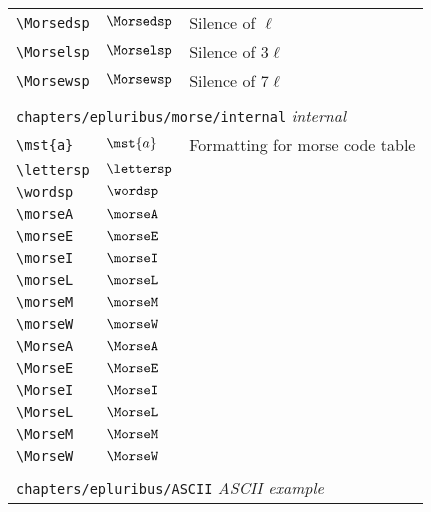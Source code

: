\begin{longtable}{lll}
 {\color[rgb]{0.5,0.5,0.5}\texttt{\textbackslash Morsedsp}} & $\Morsedsp$ &  Silence of $\ell$\\ 
 {\color[rgb]{0.5,0.5,0.5}\texttt{\textbackslash Morselsp}} & $\Morselsp$ &  Silence of $3\ell$\\ 
 {\color[rgb]{0.5,0.5,0.5}\texttt{\textbackslash Morsewsp}} & $\Morsewsp$ &  Silence of $7\ell$\\ 
  &  & \\ 
 \multicolumn{3}{l}{{\color[rgb]{0.5,0.5,0.5}\texttt{chapters/epluribus/morse/internal}} \emph{internal}}\\ 
 \hline
{\color[rgb]{0.5,0.5,0.5}\texttt{\textbackslash mst\{a\}}} & $\mst{a}$ &  Formatting for morse code table\\ 
 {\color[rgb]{0.5,0.5,0.5}\texttt{\textbackslash lettersp}} & $\lettersp$ & \\ 
 {\color[rgb]{0.5,0.5,0.5}\texttt{\textbackslash wordsp}} & $\wordsp$ & \\ 
 {\color[rgb]{0.5,0.5,0.5}\texttt{\textbackslash morseA}} & $\morseA$ & \\ 
 {\color[rgb]{0.5,0.5,0.5}\texttt{\textbackslash morseE}} & $\morseE$ & \\ 
 {\color[rgb]{0.5,0.5,0.5}\texttt{\textbackslash morseI}} & $\morseI$ & \\ 
 {\color[rgb]{0.5,0.5,0.5}\texttt{\textbackslash morseL}} & $\morseL$ & \\ 
 {\color[rgb]{0.5,0.5,0.5}\texttt{\textbackslash morseM}} & $\morseM$ & \\ 
 {\color[rgb]{0.5,0.5,0.5}\texttt{\textbackslash morseW}} & $\morseW$ & \\ 
 {\color[rgb]{0.5,0.5,0.5}\texttt{\textbackslash MorseA}} & $\MorseA$ & \\ 
 {\color[rgb]{0.5,0.5,0.5}\texttt{\textbackslash MorseE}} & $\MorseE$ & \\ 
 {\color[rgb]{0.5,0.5,0.5}\texttt{\textbackslash MorseI}} & $\MorseI$ & \\ 
 {\color[rgb]{0.5,0.5,0.5}\texttt{\textbackslash MorseL}} & $\MorseL$ & \\ 
 {\color[rgb]{0.5,0.5,0.5}\texttt{\textbackslash MorseM}} & $\MorseM$ & \\ 
 {\color[rgb]{0.5,0.5,0.5}\texttt{\textbackslash MorseW}} & $\MorseW$ & \\ 
  &  & \\ 
 \multicolumn{3}{l}{{\color[rgb]{0.5,0.5,0.5}\texttt{chapters/epluribus/ASCII}} \emph{ASCII example}}\\ 
 \hline

\end{longtable}
